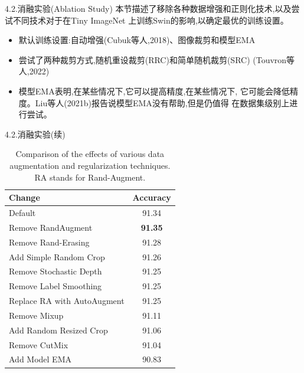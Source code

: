 \documentclass[UTF8]{ctexbeamer}
\begin{document}
\begin{frame}{4.2.消融实验(Ablation Study)}
  本节描述了移除各种数据增强和正则化技术,以及尝试不同技术对于在Tiny ImageNet
  上训练Swin的影响,以确定最优的训练设置。

  \begin{itemize}
    \item 默认训练设置:自动增强(Cubuk等人,2018)、图像裁剪和模型EMA
    \item 尝试了两种裁剪方式,随机重设裁剪(RRC)和简单随机裁剪(SRC)
    (Touvron等人,2022)
    \item 模型EMA表明,在某些情况下,它可以提高精度,在某些情况下,
    它可能会降低精度。Liu等人(2021b)报告说模型EMA没有帮助,但是仍值得
    在数据集级别上进行尝试。
  \end{itemize}
\end{frame}

\begin{frame}{4.2.消融实验(续)}
  \begin{table}[h]
    \centering
    \caption{Comparison of the effects of various data augmentation and regularization techniques. RA stands for Rand-Augment.}
    \begin{tabular}{|l|c|}
    \hline
    \textbf{Change} & \textbf{Accuracy} \\
    \hline
    Default & 91.34 \\
    Remove RandAugment & \textbf{91.35} \\
    Remove Rand-Erasing & 91.28 \\
    Add Simple Random Crop & 91.26 \\
    Remove Stochastic Depth & 91.25 \\
    Remove Label Smoothing & 91.25 \\
    Replace RA with AutoAugment & 91.25 \\
    Remove Mixup & 91.11 \\
    Add Random Resized Crop & 91.06 \\
    Remove CutMix & 91.04 \\
    Add Model EMA & 90.83 \\
    \hline
    \end{tabular}
  \end{table}    
\end{frame}
\end{document}
